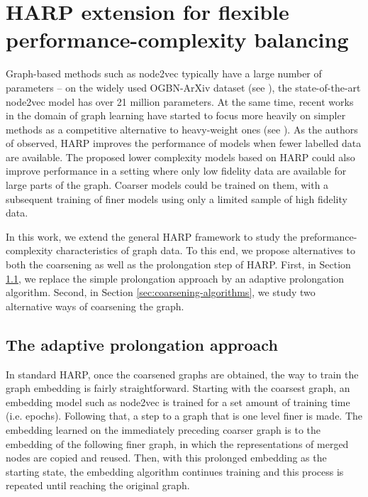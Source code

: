 \section{HARP extension for flexible performance-complexity balancing}

Graph-based methods such as node2vec typically have a large number of parameters -- on the widely used OGBN-ArXiv dataset (see \cite{hu_open_2021}), the state-of-the-art node2vec model has over 21 million parameters. At the same time, recent works in the domain of graph learning have started to focus more heavily on simpler methods as a competitive alternative to heavy-weight ones (see \cite{frasca_sign_2020,huang_combining_2020,salha_keep_2019,zhang_eigen-gnn_2021}). As the authors of \cite{chen_harp_2018} observed, HARP improves the performance of models when fewer labelled data are available. The proposed lower complexity models based on HARP could also improve performance in a setting where only low fidelity data are available for large parts of the graph. Coarser models could be trained on them, with a subsequent training of finer models using only a limited sample of high fidelity data.

In this work, we extend the general HARP framework to study the preformance-complexity characteristics of graph data. To this end, we propose alternatives to both the coarsening as well as the prolongation step of HARP. First, in Section \ref{sec:adaptive-prolongation}, we replace the simple prolongation approach by an adaptive prolongation algorithm. Second, in Section \ref{sec:coarsening-algorithms}, we study two alternative ways of coarsening the graph.

\subsection{The adaptive prolongation approach}\label{sec:adaptive-prolongation}

In standard HARP, once the coarsened graphs are obtained, the way to train the graph embedding is fairly straightforward. Starting with the coarsest graph, an embedding model such as node2vec is trained for a set amount of training time (i.e. epochs). Following that, a step to a graph that is one level finer is made. The embedding learned on the immediately preceding coarser graph is  to the embedding of the following finer graph, in which the representations of merged nodes are copied and reused. Then, with this prolonged embedding as the starting state, the embedding algorithm continues training and this process is repeated until reaching the original graph.


